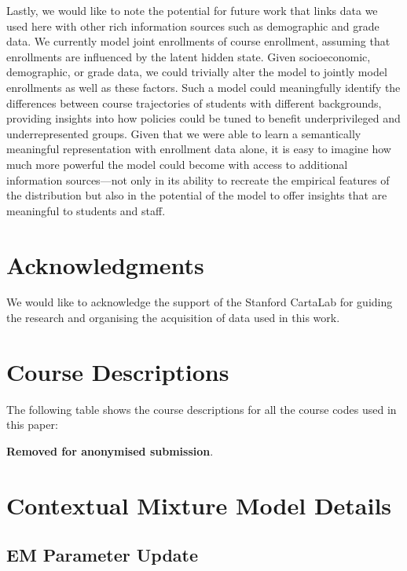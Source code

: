 \documentclass{edm_template}
\begin{document}
Lastly, we would like to note the potential for future work that links data we used here with other rich information sources such as demographic and grade data. We currently model joint enrollments of course enrollment, assuming that enrollments are influenced by the latent hidden state. Given socioeconomic, demographic, or grade data, we could trivially alter the model to jointly model enrollments as well as these factors. Such a model could meaningfully identify the differences between course trajectories of students with different backgrounds, providing insights into how policies could be tuned to benefit underprivileged and underrepresented groups. Given that we were able to learn a semantically meaningful representation with enrollment data alone, it is easy to imagine how much more powerful the model could become with access to additional information sources---not only in its ability to recreate the empirical features of the distribution but also in the potential of the model to offer insights that are meaningful to students and staff. 

\section{Acknowledgments}

We would like to acknowledge the support of the Stanford CartaLab for guiding the research and organising the acquisition of data used in this work.  


 


\balancecolumns
\appendix

\section{Course Descriptions}
\label{app:course_descriptions}

The following table shows the course descriptions for all the course codes used in this paper:

\textbf{Removed for anonymised submission}.

\section{Contextual Mixture Model Details}
\subsection{EM Parameter Update}
\label{app:em_update}
\end{document}
